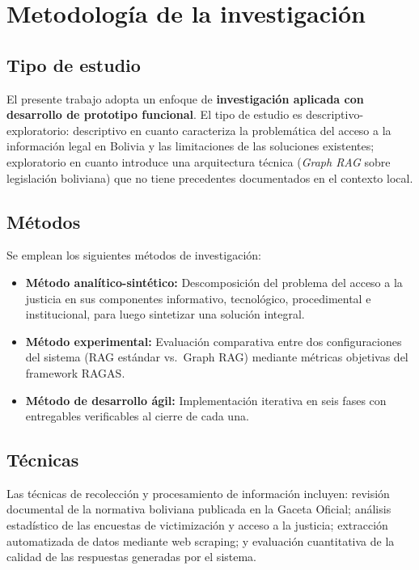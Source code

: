 \documentclass[12pt, letterpaper]{report}
\begin{document}
\section{Metodolog\'{i}a de la investigaci\'{o}n}

\subsection{Tipo de estudio}

El presente trabajo adopta un enfoque de \textbf{investigaci\'{o}n aplicada con desarrollo de prototipo funcional}. El tipo de estudio es descriptivo-exploratorio: descriptivo en cuanto caracteriza la problem\'{a}tica del acceso a la informaci\'{o}n legal en Bolivia y las limitaciones de las soluciones existentes; exploratorio en cuanto introduce una arquitectura t\'{e}cnica (\textit{Graph RAG} sobre legislaci\'{o}n boliviana) que no tiene precedentes documentados en el contexto local.

\subsection{M\'{e}todos}

Se emplean los siguientes m\'{e}todos de investigaci\'{o}n:

\begin{itemize}
  \item \textbf{M\'{e}todo anal\'{i}tico-sint\'{e}tico:} Descomposici\'{o}n del problema del acceso a la justicia en sus componentes informativo, tecnol\'{o}gico, procedimental e institucional, para luego sintetizar una soluci\'{o}n integral.
  \item \textbf{M\'{e}todo experimental:} Evaluaci\'{o}n comparativa entre dos configuraciones del sistema (RAG est\'{a}ndar vs.\ Graph RAG) mediante m\'{e}tricas objetivas del framework RAGAS.
  \item \textbf{M\'{e}todo de desarrollo \'{a}gil:} Implementaci\'{o}n iterativa en seis fases con entregables verificables al cierre de cada una.
\end{itemize}

\subsection{T\'{e}cnicas}

Las t\'{e}cnicas de recolecci\'{o}n y procesamiento de informaci\'{o}n incluyen: revisi\'{o}n documental de la normativa boliviana publicada en la Gaceta Oficial; an\'{a}lisis estad\'{i}stico de las encuestas de victimizaci\'{o}n y acceso a la justicia; extracci\'{o}n automatizada de datos mediante web scraping; y evaluaci\'{o}n cuantitativa de la calidad de las respuestas generadas por el sistema.
\end{document}
